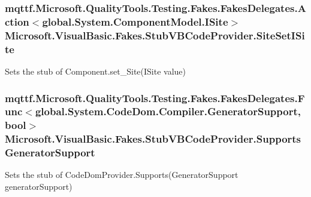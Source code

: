 \hypertarget{class_microsoft_1_1_visual_basic_1_1_fakes_1_1_stub_v_b_code_provider_a6dc190d9583e62aaab56a53bcae1cf60}{
\subsubsection[{Site\-Set\-I\-Site}]{\setlength{\rightskip}{0pt plus 5cm}mqttf.\-Microsoft.\-Quality\-Tools.\-Testing.\-Fakes.\-Fakes\-Delegates.\-Action$<$global.\-System.\-Component\-Model.\-I\-Site$>$ Microsoft.\-Visual\-Basic.\-Fakes.\-Stub\-V\-B\-Code\-Provider.\-Site\-Set\-I\-Site}}\label{class_microsoft_1_1_visual_basic_1_1_fakes_1_1_stub_v_b_code_provider_a6dc190d9583e62aaab56a53bcae1cf60}


Sets the stub of Component.\-set\-\_\-\-Site(\-I\-Site value)

\hypertarget{class_microsoft_1_1_visual_basic_1_1_fakes_1_1_stub_v_b_code_provider_a740c48de8d85490c8b8cbbfc5eb61b33}{
\subsubsection[{Supports\-Generator\-Support}]{\setlength{\rightskip}{0pt plus 5cm}mqttf.\-Microsoft.\-Quality\-Tools.\-Testing.\-Fakes.\-Fakes\-Delegates.\-Func$<$global.\-System.\-Code\-Dom.\-Compiler.\-Generator\-Support, bool$>$ Microsoft.\-Visual\-Basic.\-Fakes.\-Stub\-V\-B\-Code\-Provider.\-Supports\-Generator\-Support}}\label{class_microsoft_1_1_visual_basic_1_1_fakes_1_1_stub_v_b_code_provider_a740c48de8d85490c8b8cbbfc5eb61b33}


Sets the stub of Code\-Dom\-Provider.\-Supports(\-Generator\-Support generator\-Support)

